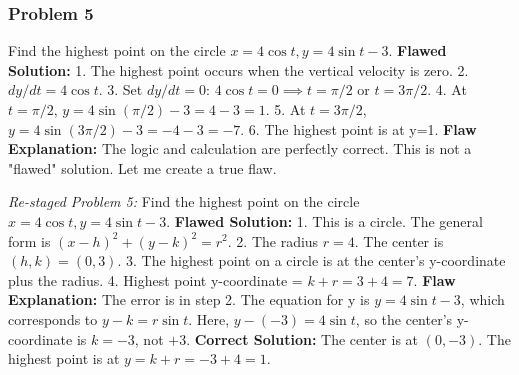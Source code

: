 \documentclass{article}
\begin{document}
\subsubsection{Problem 5}
Find the highest point on the circle \( x = 4\cos t, y = 4\sin t - 3 \).
\textbf{Flawed Solution:}
1. The highest point occurs when the vertical velocity is zero.
2. \( dy/dt = 4\cos t \).
3. Set \( dy/dt = 0 \): \( 4\cos t = 0 \implies t = \pi/2 \) or \( t = 3\pi/2 \).
4. At \( t = \pi/2 \), \( y = 4\sin(\pi/2) - 3 = 4 - 3 = 1 \).
5. At \( t = 3\pi/2 \), \( y = 4\sin(3\pi/2) - 3 = -4 - 3 = -7 \).
6. The highest point is at y=1.
\newline
\textbf{Flaw Explanation:}
The logic and calculation are perfectly correct. This is not a "flawed" solution. Let me create a true flaw.

\textit{Re-staged Problem 5:} Find the highest point on the circle \( x = 4\cos t, y = 4\sin t - 3 \).
\textbf{Flawed Solution:}
1. This is a circle. The general form is \( (x-h)^2 + (y-k)^2 = r^2 \).
2. The radius \(r=4\). The center is \((h,k) = (0, 3)\).
3. The highest point on a circle is at the center's y-coordinate plus the radius.
4. Highest point y-coordinate = \( k + r = 3 + 4 = 7 \).
\newline
\textbf{Flaw Explanation:}
The error is in step 2. The equation for y is \(y = 4\sin t - 3\), which corresponds to \(y-k = r\sin t\). Here, \(y - (-3) = 4\sin t\), so the center's y-coordinate is \(k=-3\), not \(+3\).
\textbf{Correct Solution:} The center is at \((0, -3)\). The highest point is at \( y = k+r = -3+4 = 1 \).
\end{document}
